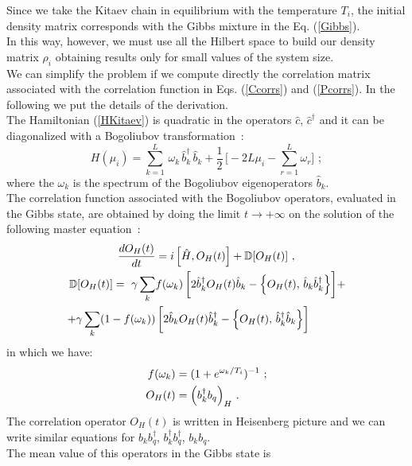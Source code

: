 \documentclass[pra,twocolumn,preprintnumbers,amsmath,amssymb,nofootinbib,floatfix,longbibliography]{revtex4}
\begin{document}
Since we take the Kitaev chain in
equilibrium with the temperature $T_i$, the initial density
matrix corresponds with the Gibbs mixture in the Eq.
(\ref{Gibbs}).\\
In this way, however, we must use all the Hilbert space to
build our density matrix $\rho_i$ obtaining results only
for small values of the system size.\\
We can simplify the problem if we compute directly the
correlation matrix associated with the correlation function
in Eqs. (\ref{Ccorrs}) and (\ref{Pcorrs}). In the following
we put the details of the derivation.\\
\medskip
The Hamiltonian (\ref{HKitaev}) is quadratic in the operators $\hat c,\,\hat c^\dagger$ and it can be diagonalized with a Bogoliubov transformation~\cite{BGN88}:
\begin{equation}
  \label{Hdiag}
  H(\mu_i)=\sum _{k=1}^L\,\omega _k \,\hat b^\dagger _k\,
  \hat b_k+ \frac{1}{2}\,\Bigr[ -2L\mu_i - \sum _{r=1}^L
  \omega _r \Bigr] \,\,;
\end{equation}
where the $\omega_k$ is the spectrum of the Bogoliubov
eigenoperators $\hat b_k$.\\
The correlation function associated with the Bogoliubov
operators, evaluated in the Gibbs state, are obtained by
doing the limit $t \to +\infty$ on the solution of the
following master equation~\cite{PCD22, DR21}:
\begin{align}
   \label{EQLindblad}
   \frac{d O_{H}(t) }{d t}  &= i\,\Bigr[\hat H,
      O_{H}(t) \Bigr] + \mathbb{D}[O_{H}(t)]\,\,,\\
  \mathbb{D}[O_H(t)] =
  \,\,\gamma \sum _k &
  f(\omega_k)\,\biggr[2\hat b_{k}^\dagger O_H(t)\hat b_{k}-
  \Bigl\{ O_H(t), \, \hat b_{k} \hat b_{k}^\dagger \Bigl\}
  \biggr]  + \notag\\
  +\gamma \sum_k  (1-f(\omega_k)) &
  \,\biggr[ 2\hat b_{k} O_H(t) \hat b_{k}^\dagger - \Bigl\{
  O_H(t), \, \hat b_{k}^\dagger \hat b_{k} \Bigl\} \biggr]
\end{align}
in which we have:
\begin{align}
  f(\omega_k) &= (1 + e^{\omega_k/T_i})^{-1} \,\,;\\
  O_H(t) &= \Bigl(b^\dagger_k b_q\Bigl)_H\,\,.
\end{align}
The correlation operator $O_{H}(t)$ is written in
Heisenberg picture and we can write similar equations for
$b_k b^\dagger_q$, $b^\dagger_k b^\dagger_q$, $b_k b_q$. \\
The mean value of this operators in the Gibbs state is
\end{document}
